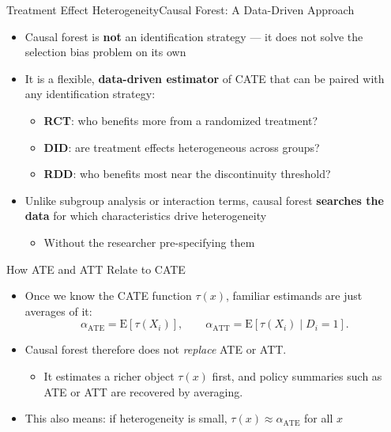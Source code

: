 \documentclass[hyperref={pdfpagelabels=false}]{beamer}
\begin{document}
\begin{frame}{Treatment Effect Heterogeneity}{Causal Forest: A Data-Driven Approach}
\begin{itemize}
  \item Causal forest is \textbf{not} an identification strategy --- it does not solve the selection bias problem on its own
  \vspace{0.2cm}
  \item It is a flexible, \textbf{data-driven estimator} of CATE that can be paired with any identification strategy:
  \vspace{0.1cm}
  \begin{itemize}
    \item \textbf{RCT}: who benefits more from a randomized treatment?
    \vspace{0.1cm}
    \item \textbf{DID}: are treatment effects heterogeneous across groups?
    \vspace{0.1cm}
    \item \textbf{RDD}: who benefits most near the discontinuity threshold?
  \end{itemize}
  \vspace{0.2cm}
  \item Unlike subgroup analysis or interaction terms, causal forest \textbf{searches the data} for which characteristics drive heterogeneity
    \vspace{0.2cm}
  \begin{itemize}

  \item Without the researcher pre-specifying them
  \end{itemize}

\end{itemize}
\end{frame}

\begin{frame}{How ATE and ATT Relate to CATE}
\begin{itemize}
  \item Once we know the CATE function $\tau(x)$, familiar estimands are just averages of it:
  \[
    \alpha_{\text{ATE}} = \mathrm{E}\!\left[\tau(X_i)\right], \qquad
    \alpha_{\text{ATT}} = \mathrm{E}\!\left[\tau(X_i)\mid D_i=1\right].
  \]
  \vspace{0.2cm}
  \item Causal forest therefore does not \emph{replace} ATE or ATT.
  \vspace{0.1cm}
  \begin{itemize}
    \item It estimates a richer object $\tau(x)$ first, and policy summaries such as ATE or ATT are recovered by averaging.
  \end{itemize}
  \vspace{0.2cm}
  \item This also means: if heterogeneity is small, $\tau(x) \approx \alpha_{\text{ATE}}$ for all $x$ 

\end{itemize}
\end{frame}
\end{document}

